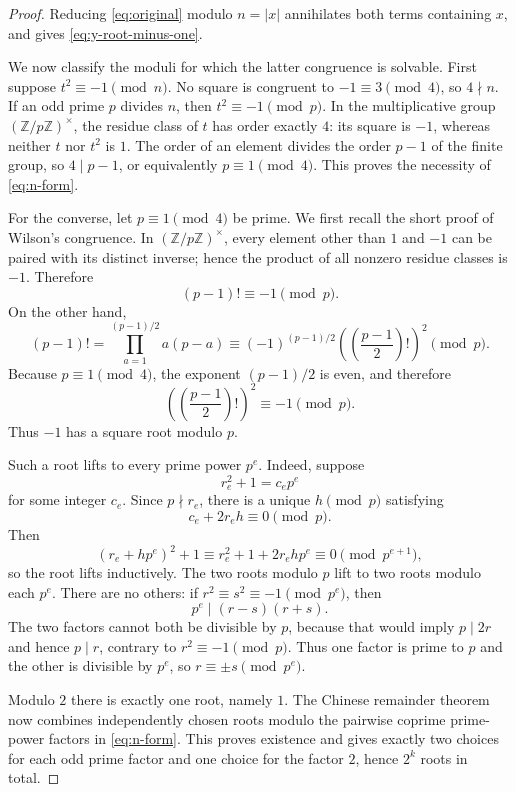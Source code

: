 \documentclass[a4paper,11pt]{amsart}
\theoremstyle{definition}
\theoremstyle{remark}
\newcommand{\Z}{\mathbb Z}
\begin{document}
\begin{proof}
Reducing \eqref{eq:original} modulo $n=|x|$ annihilates both terms containing $x$, and gives \eqref{eq:y-root-minus-one}.

We now classify the moduli for which the latter congruence is solvable.  First suppose $t^2\equiv-1\pmod n$.  No square is congruent to $-1\equiv3\pmod4$, so $4\nmid n$.  If an odd prime $p$ divides $n$, then $t^2\equiv-1\pmod p$.  In the multiplicative group $(\Z/p\Z)^\times$, the residue class of $t$ has order exactly $4$: its square is $-1$, whereas neither $t$ nor $t^2$ is $1$.  The order of an element divides the order $p-1$ of the finite group, so $4\mid p-1$, or equivalently $p\equiv1\pmod4$.  This proves the necessity of \eqref{eq:n-form}.

For the converse, let $p\equiv1\pmod4$ be prime.  We first recall the short proof of Wilson's congruence.  In $(\Z/p\Z)^\times$, every element other than $1$ and $-1$ can be paired with its distinct inverse; hence the product of all nonzero residue classes is $-1$.  Therefore
\[
(p-1)!\equiv-1\pmod p.
\]
On the other hand,
\[
(p-1)!
 =\prod_{a=1}^{(p-1)/2}a(p-a)
 \equiv(-1)^{(p-1)/2}
 \left(\left(\frac{p-1}{2}\right)!\right)^2\pmod p.
\]
Because $p\equiv1\pmod4$, the exponent $(p-1)/2$ is even, and therefore
\[
\left(\left(\frac{p-1}{2}\right)!\right)^2\equiv-1\pmod p.
\]
Thus $-1$ has a square root modulo $p$.

Such a root lifts to every prime power $p^e$.  Indeed, suppose
\[
r_e^2+1=c_ep^e
\]
for some integer $c_e$.  Since $p\nmid r_e$, there is a unique $h\pmod p$ satisfying
\[
c_e+2r_eh\equiv0\pmod p.
\]
Then
\[
(r_e+hp^e)^2+1
 \equiv r_e^2+1+2r_ehp^e
 \equiv0\pmod{p^{e+1}},
\]
so the root lifts inductively.  The two roots modulo $p$ lift to two roots modulo each $p^e$.  There are no others: if $r^2\equiv s^2\equiv-1\pmod{p^e}$, then
\[
p^e\mid(r-s)(r+s).
\]
The two factors cannot both be divisible by $p$, because that would imply $p\mid2r$ and hence $p\mid r$, contrary to $r^2\equiv-1\pmod p$.  Thus one factor is prime to $p$ and the other is divisible by $p^e$, so $r\equiv\pm s\pmod{p^e}$.

Modulo $2$ there is exactly one root, namely $1$.  The Chinese remainder theorem now combines independently chosen roots modulo the pairwise coprime prime-power factors in \eqref{eq:n-form}.  This proves existence and gives exactly two choices for each odd prime factor and one choice for the factor $2$, hence $2^k$ roots in total.
\end{proof}
\end{document}
